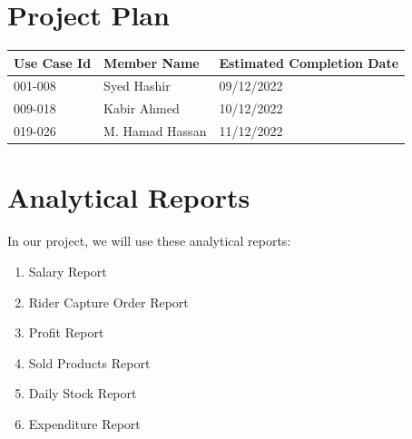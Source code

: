 \documentclass[12pt,a4paper]{report}
\begin{document}
\chapter {Project Plan}
\begin{tabular}{ | m{2cm} | m{4cm}|| m{3cm}|} \hline
\textbf{ Use Case Id }&\textbf{ Member Name}&\textbf{Estimated Completion Date} \\ \hline
001-008& Syed Hashir 	&09/12/2022   \\ \hline
009-018& Kabir Ahmed	&10/12/2022   \\ \hline
019-026& M. Hamad Hassan&11/12/2022  \\ \hline
\end{tabular}


\newpage
\chapter {Analytical Reports}
In our project, we will use these analytical reports:
\begin{enumerate}
\item Salary Report  
\item Rider Capture Order Report 
\item Profit Report 
\item Sold Products Report
\item Daily Stock Report 
\item Expenditure Report
\end{enumerate}
\end{document}
